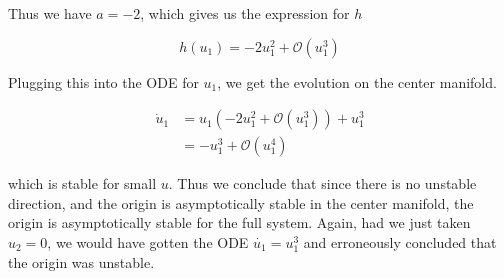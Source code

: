 \documentclass{article}
\begin{document}
Thus we have $a = -2$, which gives us the expression for $h$

\[
h(u_1) = -2 u_1^2 + \mathcal{O}(u_1^3)
\]

Plugging this into the ODE for $u_1$, we get the evolution on the center manifold.

\begin{align*}
\dot{u}_1 &= u_1 (-2 u_1^2 + \mathcal{O}(u_1^3)) + u_1^3 \\
&= -u_1^3 + \mathcal{O}(u_1^4)
\end{align*}

which is stable for small $u$. Thus we conclude that since there is no unstable direction, and the origin is asymptotically stable in the center manifold, the origin is asymptotically stable for the full system. Again, had we just taken $u_2 = 0$, we would have gotten the ODE $\dot{u_1} = u_1^3$ and erroneously concluded that the origin was unstable.
\end{document}

